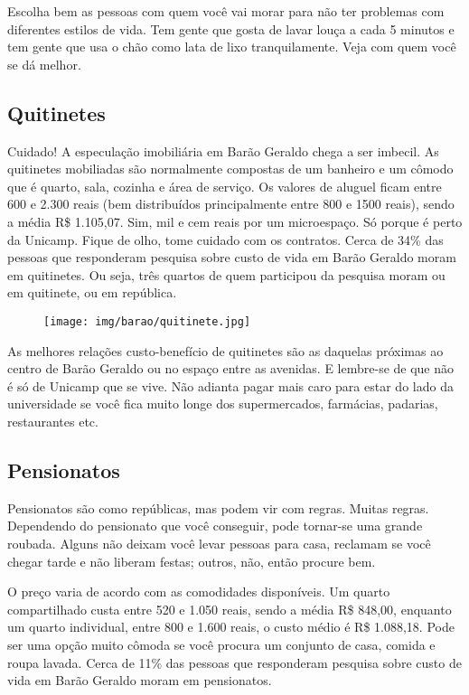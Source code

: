 Escolha bem as pessoas com quem você vai morar para não ter problemas com
diferentes estilos de vida. Tem gente que gosta de lavar louça a cada 5 minutos
e tem gente que usa o chão como lata de lixo tranquilamente. Veja com quem você
se dá melhor.

\subsection{Quitinetes}

Cuidado! A especulação imobiliária em Barão Geraldo chega a ser imbecil. As
quitinetes mobiliadas são normalmente compostas de um banheiro e um cômodo que
é quarto, sala, cozinha e área de serviço. Os valores de aluguel ficam entre
600 e 2.300 reais (bem distribuídos principalmente entre 800 e 1500 reais),
sendo a média R\$ 1.105,07. Sim, mil e cem reais por um microespaço. Só porque
é perto da Unicamp. Fique de olho, tome cuidado com os contratos. Cerca de 34\%
das pessoas que responderam pesquisa sobre custo de vida em Barão Geraldo moram
em quitinetes. Ou seja, três quartos de quem participou da pesquisa moram ou
em quitinete, ou em república.

\begin{figure}[h!]
    \centering
    \texttt{[image: img/barao/quitinete.jpg]}
\end{figure}

As melhores relações custo-benefício de quitinetes são as daquelas próximas ao
centro de Barão Geraldo ou no espaço entre as avenidas. E lembre-se de que não
é só de Unicamp que se vive. Não adianta pagar mais caro para estar do lado da
universidade se você fica muito longe dos supermercados, farmácias, padarias,
restaurantes etc.

\subsection{Pensionatos}

Pensionatos são como repúblicas, mas podem vir com regras. Muitas regras.
Dependendo do pensionato que você conseguir, pode tornar-se uma grande roubada.
Alguns não deixam você levar pessoas para casa, reclamam se você chegar tarde e
não liberam festas; outros, não, então procure bem.

O preço varia de acordo com as comodidades disponíveis. Um quarto compartilhado
custa entre 520 e 1.050 reais, sendo a média R\$ 848,00, enquanto um quarto
individual, entre 800 e 1.600 reais, o custo médio é R\$ 1.088,18. Pode ser uma
opção muito cômoda se você procura um conjunto de casa, comida e roupa lavada.
Cerca de 11\% das pessoas que responderam pesquisa sobre custo de vida em Barão
Geraldo moram em pensionatos.

